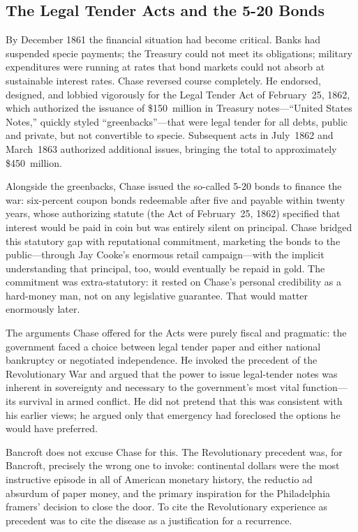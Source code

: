 \documentclass[12pt]{article}
\begin{document}
\subsection{The Legal Tender Acts and the 5-20 Bonds}

By December 1861 the financial situation had become critical.  Banks had
suspended specie payments; the Treasury could not meet its obligations;
military expenditures were running at rates that bond markets could not
absorb at sustainable interest rates.  Chase reversed course completely.
He endorsed, designed, and lobbied vigorously for the Legal Tender Act
of February~25, 1862, which authorized the issuance of \$150~million in
Treasury notes---``United States Notes,'' quickly styled
``greenbacks''---that were legal tender for all debts, public and
private, but not convertible to specie.  Subsequent acts in July~1862
and March~1863 authorized additional issues, bringing the total to
approximately \$450~million.

Alongside the greenbacks, Chase issued the so-called 5-20 bonds to
finance the war: six-percent coupon bonds redeemable after five and
payable within twenty years, whose authorizing statute (the Act of
February~25, 1862) specified that interest would be paid in coin but
was entirely silent on principal.  Chase bridged this statutory gap with
reputational commitment, marketing the bonds to the public---through Jay
Cooke's enormous retail campaign---with the implicit understanding that
principal, too, would eventually be repaid in gold.  The commitment was
extra-statutory: it rested on Chase's personal credibility as a
hard-money man, not on any legislative guarantee.  That would matter
enormously later.

The arguments Chase offered for the Acts were purely fiscal and
pragmatic: the government faced a choice between legal tender paper and
either national bankruptcy or negotiated independence.  He invoked the
precedent of the Revolutionary War and argued that the power to issue
legal-tender notes was inherent in sovereignty and necessary to the
government's most vital function---its survival in armed conflict.  He
did not pretend that this was consistent with his earlier views; he
argued only that emergency had foreclosed the options he would have
preferred.

Bancroft does not excuse Chase for this.  The Revolutionary precedent
was, for Bancroft, precisely the wrong one to invoke: continental
dollars were the most instructive episode in all of American monetary
history, the reductio ad absurdum of paper money, and the primary
inspiration for the Philadelphia framers' decision to close the door.
To cite the Revolutionary experience as precedent was to cite the
disease as a justification for a recurrence.
\end{document}
